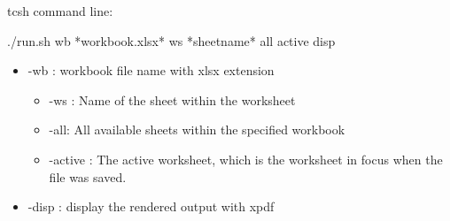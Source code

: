 \documentclass[letterpaper,10pt,english]{sphinxmanual}
\begin{document}
tcsh command line:

%
\begin{sphinxVerbatim}[commandchars=\\\{\}]
./run.sh \PYGZhy{}wb *\PYGZlt{}workbook.xlsx\PYGZgt{}* \PYG{o}{[} \PYGZhy{}ws *\PYGZlt{}sheet\PYGZus{}name\PYGZgt{}*  \PYGZhy{}all  \PYGZhy{}active \PYG{o}{]} \PYGZhy{}disp
\end{sphinxVerbatim}
\begin{itemize}
\item {} 
-wb : workbook file name with xlsx extension
\begin{itemize}
\item {} 
-ws : Name of the sheet within the worksheet

\item {} 
-all: All available sheets within the specified workbook

\item {} 
-active : The active worksheet, which is the worksheet in focus when the
file was saved.

\end{itemize}

\item {} 
-disp : display the rendered output with xpdf

\end{itemize}
\end{document}
